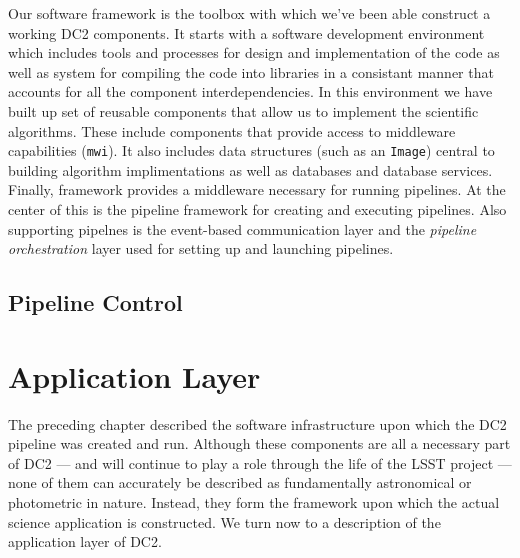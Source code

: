 \documentclass[preprint]{aastex}
\newcommand{\code}[1]{\texttt{#1}}
\begin{document}
Our software framework is the toolbox with which we've been able
construct a working DC2 components.  It starts with a software
development environment which includes tools and processes for design
and implementation of the code as well as system for compiling the
code into libraries in a consistant manner that accounts for all the
component interdependencies.  In this environment we have built up set
of reusable components that allow us to implement the scientific
algorithms.  These include components that provide access to
middleware capabilities ({\tt mwi}).  It also includes data structures
(such as an \code{Image}) central to building algorithm
implimentations as well as databases and database services.  Finally,
framework provides a middleware necessary for running pipelines.  At
the center of this is the pipeline framework for creating and
executing pipelines.  Also supporting pipelnes is the event-based
communication layer and the \textit{pipeline orchestration} layer used
for setting up and launching pipelines. 








\subsection{Pipeline Control}



\section{Application Layer}

The preceding chapter described the software infrastructure upon 
which the DC2 pipeline was created and run. Although these
components are all a necessary part of DC2 --- and will continue
to play a role through the life of the LSST project --- none of them can
accurately be described as fundamentally astronomical or
photometric in nature. Instead, they form the framework upon which 
the actual science application is constructed. We turn now to 
a description of the application layer of DC2.







\end{document}
